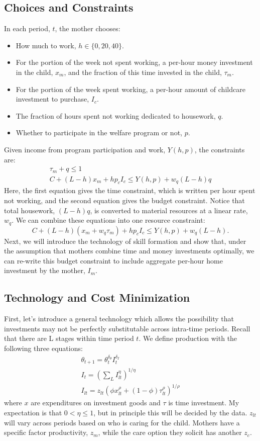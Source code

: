 \documentclass[12pt]{article}
\numberwithin{equation}{section}
\numberwithin{figure}{section}
\numberwithin{table}{section}
\begin{document}
\subsection{Choices and Constraints}
In each period, $t$, the mother chooses:
\begin{itemize}
\item How much to work, $h\in\{0,20,40\}$.
\item For the portion of the week not spent working, a per-hour money investment in the child, $x_m$, and the fraction of this time invested in the child, $\tau_m$.
\item For the portion of the week spent working, a per-hour amount of childcare investment to purchase, $I_c$.
\item The fraction of hours spent not working dedicated to housework, $q$.
\item Whether to participate in the welfare program or not, $p$.
\end{itemize}
Given income from program participation and work, $Y(h,p)$, the constraints are:
\begin{eqnarray}
\tau_m + q \leq 1 \\
C + (L-h)x_m + hp_cI_c \leq Y(h,p) + w_q(L-h)q
\end{eqnarray}
Here, the first equation gives the time constraint, which is written per hour spent not working, and the second equation gives the budget constraint. Notice that total housework, $(L-h)q$, is converted to material resources at a linear rate, $w_q$.
We can combine these equations into one resource constraint:
\[ C + (L-h)(x_m + w_q\tau_m) + hp_cI_c \leq Y(h,p) + w_q(L-h). \]
Next, we will introduce the technology of skill formation and show that, under the assumption that mothers combine time and money investments optimally, we can re-write this budget constraint to include aggregate per-hour home investment by the mother, $I_m$.

\subsection{Technology and Cost Minimization}
First, let's introduce a general technology which allows the possibility that investments may not be perfectly substitutable across intra-time periods. Recall that there are L stages within time period $t$. We define production with the following three equations:
\begin{eqnarray}
\theta_{t+1} = \theta_t^{\delta_\theta} I_t^{\delta_I} \\
I_t = \left(\sum_L I_{lt}^\eta \right)^{1/\eta} \\
I_{lt} = z_{lt}\left(\phi x_{lt}^\rho + (1-\phi) \tau_{lt}^\rho \right)^{1/\rho}
\end{eqnarray}
where $x$ are expenditures on investment goods and $\tau$ is time investment. My expectation is that $0<\eta\leq 1$, but in principle this will be decided by the data. $z_{lt}$ will vary across periods based on who is caring for the child. Mothers have a specific factor productivity, $z_m$, while the care option they solicit has another $z_{c}$.
\end{document}
